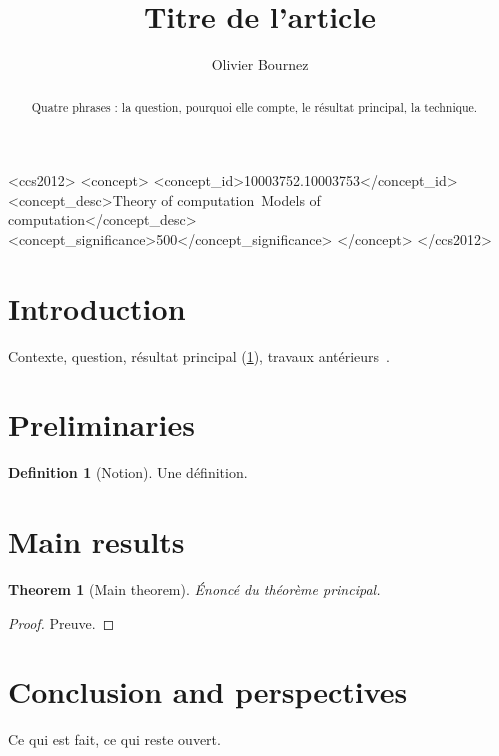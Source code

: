 \documentclass[sigconf,screen]{acmart}
\makeatletter
\providecommand\BIBFILES{@@reference-biblio}
\newtheorem{theorem}{Theorem}
\theoremstyle{definition}
\newtheorem{definition}{Definition}
\theoremstyle{remark}
\makeatother
\begin{document}
\title{Titre de l'article}
\author{Olivier Bournez}
\renewcommand{\shortauthors}{Bournez}

\begin{abstract}
Quatre phrases : la question, pourquoi elle compte, le résultat principal, la technique.
\end{abstract}

\begin{CCSXML}
<ccs2012>
<concept>
<concept_id>10003752.10003753</concept_id>
<concept_desc>Theory of computation~Models of computation</concept_desc>
<concept_significance>500</concept_significance>
</concept>
</ccs2012>
\end{CCSXML}

\maketitle

\section{Introduction}
\label{sec:intro}

Contexte, question, résultat principal (\cref{thm:main}), travaux antérieurs~\cite{JournalACM2017}.

\section{Preliminaries}
\label{sec:prelim}

\begin{definition}[Notion]
\label{def:notion}
Une définition.
\end{definition}

\section{Main results}
\label{sec:results}

\begin{theorem}[Main theorem]
\label{thm:main}
Énoncé du théorème principal.
\end{theorem}
\begin{proof}
Preuve.
\end{proof}

\section{Conclusion and perspectives}
\label{sec:conclusion}

Ce qui est fait, ce qui reste ouvert.



\end{document}
